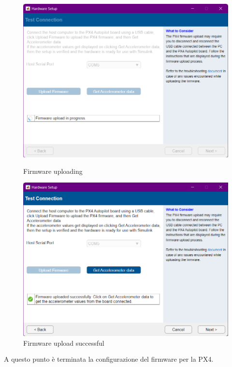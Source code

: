 \begin{figure}[htbp]
    \begin{minipage}[b]{0.5\linewidth} %
      \centering
      \includegraphics[width=\linewidth]{files/images/matlab18.png} %
      \caption{Firmware uploading} %
      \label{fig:Firmware uploading} %
    \end{minipage}%
    \begin{minipage}[b]{0.5\linewidth} %
        \centering
        \includegraphics[width=\linewidth]{files/images/matlab19.png} %
        \caption{Firmware upload successful} %
      \label{fig:Firmware upload successful} %
    \end{minipage}
\end{figure}
\noindent
A questo punto è terminata la configurazione del firmware per la PX4.

